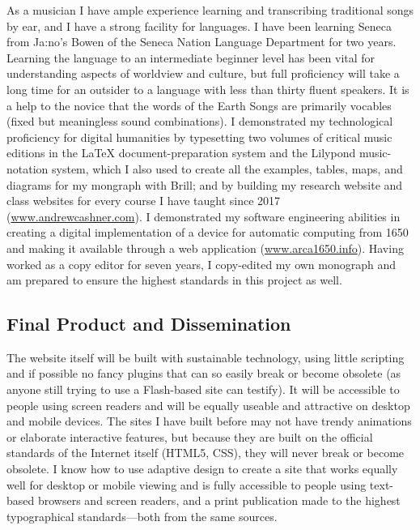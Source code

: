 \documentclass{neh}
\begin{document}
As a musician I have ample experience learning and transcribing traditional
songs by ear, and I have a strong facility for languages.
I have been learning Seneca from Ja:no’s Bowen of the Seneca Nation Language
Department for two years.
Learning the language to an intermediate beginner level has been vital for
understanding aspects of worldview and culture, but full proficiency will take
a long time for an outsider to a language with less than thirty fluent
speakers.
It is a help to the novice that the words of the Earth Songs are primarily
vocables (fixed but meaningless sound combinations).
I demonstrated my technological proficiency for digital humanities by
typesetting two volumes of critical music editions in the \LaTeX{}
document-preparation system and the Lilypond music-notation system, which I
also used to create all the examples, tables, maps, and diagrams for my
mongraph with Brill; and by building my research website and class websites
for every course I have taught since 2017 (\url{www.andrewcashner.com}).
I demonstrated my software engineering abilities in creating a digital
implementation of a device for automatic computing from 1650 and making it
available through a web application (\url{www.arca1650.info}).
Having worked as a copy editor for seven years, I copy-edited my own monograph
and am prepared to ensure the highest standards in this project as well.

\subsection{Final Product and Dissemination}

The website itself will be built with sustainable technology, using little
scripting and if possible no fancy plugins that can so easily break or become
obsolete (as anyone still trying to use a Flash-based site can testify).
It will be accessible to people using screen readers and will be equally
useable and attractive on desktop and mobile devices.
The sites I have built before may not have trendy animations or elaborate
interactive features, but because they are built on the official standards of
the Internet itself (HTML5, CSS), they will never break or become obsolete.
I know how to use adaptive design to create a site that works equally well
for desktop or mobile viewing and is fully accessible to people using
text-based browsers and screen readers, and a print publication made to the
highest typographical standards---both from the same sources.
\end{document}
